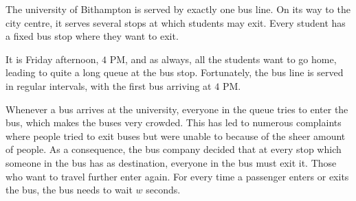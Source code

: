 

\newcommand{\maxn}{10^5}
\newcommand{\maxv}{10^6}
\newcommand{\cityname}{Bithampton\xspace}

%
The university of \cityname is served by exactly one bus line.
On its way to the city centre, it serves several stops at which students may exit.
Every student has a fixed bus stop where they want to exit.

It is Friday afternoon, $4$ PM, and as always, all the students want to go home, leading to quite a long queue at the bus stop.
Fortunately, the bus line is served in regular intervals, with the first bus arriving at $4$ PM.

Whenever a bus arrives at the university, everyone in the queue tries to enter the bus, which makes the buses very crowded.
This has led to numerous complaints where people tried to exit buses but were unable to because of the sheer amount of people.
As a consequence, the bus company decided that at every stop which someone in the bus has as destination, everyone in the bus must exit it.
Those who want to travel further enter again.
For every time a passenger enters or exits the bus, the bus needs to wait $w$ seconds.


